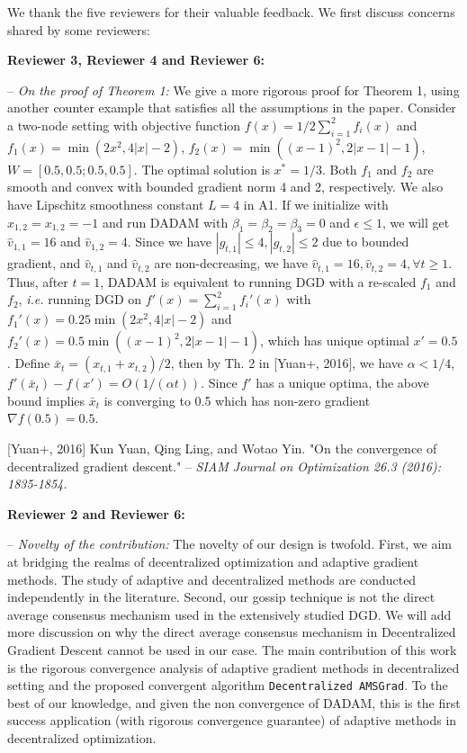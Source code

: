 \documentclass{article}
\begin{document}
We thank the five reviewers for their valuable feedback. We first discuss concerns shared by some reviewers:\vspace{-5pt}

\textbf{Reviewer 3, Reviewer 4 and Reviewer 6:} \vspace{-5pt}

-- \textit{On the proof of Theorem 1:} We give a more rigorous proof for Theorem 1, using another counter example that satisfies all the assumptions in the paper. Consider a two-node setting with objective function $f(x) =1/2 \sum_{i=1}^2 f_i(x)$ and $f_1(x) =  \min(2x^2, 4|x|-2)$, $f_2(x) =  \min((x-1)^2, 2|x-1|-1)$, $W = [0.5,0.5;0.5,0.5]$. The optimal solution is $x^* = 1/3$.
Both $f_1$ and $f_2$ are smooth and convex with bounded gradient norm 4 and 2, respectively. 
We also have Lipschitz smoothness constant $L = 4$ in A1. 
If we initialize with $x_{1,2} = x_{1,2} = -1$ and run DADAM with $\beta_1 = \beta_2 =\beta_3 = 0$ and $\epsilon \leq 1$, we will get $\hat v_{1,1} = 16$ and $\hat v_{1,2} = 4$. 
Since we have $|g_{t,1}| \leq 4, |g_{t,2}| \leq 2$ due to bounded gradient, and $\hat v_{t,1}$ and $\hat v_{t,2}$ are non-decreasing, we have $\hat v_{t,1} = 16, \hat v_{t,2}=4, \forall t \geq 1$. 
Thus, after $t=1$, DADAM is equivalent to running DGD with a re-scaled $f_1$ and $f_2$, \textit{i.e.} running DGD on
$f'(x) = \sum_{i=1}^2 f_i'(x)$ with $f_1'(x) =  0.25\min(2x^2, 4|x|-2)$ and $f_2'(x) = 0.5  \min((x-1)^2, 2|x-1|-1)$, which has unique optimal $x'=0.5$. 
Define $\bar x_t = (x_{t,1}+x_{t,2})/2$, then by Th. 2 in [Yuan+, 2016], we have $\alpha < 1/4$, $f'(\bar x_t) - f(x') = O(1/(\alpha t))$. 
Since $f'$ has a unique optima, the above bound implies $\bar x_t$ is converging to 0.5 which has non-zero gradient $\nabla f(0.5) = 0.5$.\vspace{-5pt}

[Yuan+, 2016]  Kun Yuan, Qing Ling, and Wotao Yin. "On the convergence of decentralized gradient descent." -- \textit{SIAM Journal on Optimization 26.3 (2016): 1835-1854.}


\textbf{Reviewer 2 and Reviewer 6:} \vspace{-5pt}

-- \textit{Novelty of the contribution:} The novelty of our design is twofold.
First, we aim at bridging the realms of decentralized optimization and adaptive gradient methods. 
The study of adaptive and decentralized methods are conducted independently in the literature. 
Second, our gossip technique is not the direct average consensus mechanism used in the extensively studied DGD.
We will add more discussion on why the direct average consensus mechanism in Decentralized Gradient Descent cannot be used in our case.
The main contribution of this work is the rigorous convergence analysis of adaptive gradient methods in decentralized setting and the proposed convergent algorithm \texttt{Decentralized AMSGrad}. 
To the best of our knowledge, and given the non convergence of DADAM, this is the first success application (with rigorous convergence guarantee) of adaptive methods in decentralized optimization. 
\end{document}
